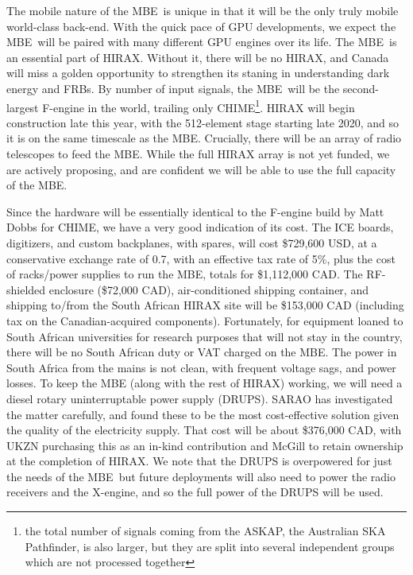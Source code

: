 \documentclass[letterpaper,11pt,preprint]{aastex}
\makeatletter
\newcommand{\mbe}{{\rm MBE}}
\def\section{\@startsection {section}{1}{\z@}{1.0ex plus 
1ex minus .2ex}{.2ex plus .2ex}{\large\bf}}
\makeatother
\begin{document}
\section{Infrastructure}
The mobile nature of the \mbe\ is unique in that it will be the only
truly mobile world-class back-end.  With the quick pace of GPU
developments, we expect the \mbe\ will be paired with many different
GPU engines over its life.  The \mbe\ is an essential part of HIRAX.
Without it, there will be no HIRAX, and Canada will miss a golden
opportunity to strengthen its staning in understanding dark energy and
FRBs.  By number of input signals, the \mbe\ will be the
second-largest F-engine in the world, trailing only CHIME\footnote{the
  total number of signals coming from the ASKAP, the Australian SKA
  Pathfinder, is also larger, but they are split into several
  independent groups which are not processed together}.  HIRAX will
begin construction late this year, with the 512-element stage starting
late 2020, and so it is on the same timescale as the \mbe.  Crucially,
there will be an array of radio telescopes to feed the \mbe.  While
the full HIRAX array is not yet funded, we are actively proposing, and
are confident we will be able to use the full capacity of the \mbe. 

Since the hardware will be essentially identical to the F-engine build
by Matt Dobbs for CHIME, we have a very good indication of its cost.
The ICE boards, digitizers, and custom backplanes, with spares, will
cost \$729,600 USD, at a conservative exchange rate of 0.7, with an
effective tax rate of 5\%, plus the cost of racks/power supplies to
run the \mbe, totals for \$1,112,000 CAD.  The RF-shielded enclosure
(\$72,000 CAD), air-conditioned shipping container, and shipping
to/from the South African HIRAX site will be \$153,000 CAD (including
tax on the Canadian-acquired components).  Fortunately, for equipment
loaned to South African universities for research purposes that will
not stay in the country, there will be no South African duty or VAT
charged on the \mbe.  The power in South Africa from the mains is not
clean, with frequent voltage sags, and power losses.  To keep the \mbe
(along with the rest of HIRAX) working, we will need a diesel rotary
uninterruptable power supply (DRUPS).  SARAO has investigated the
matter carefully, and found these to be the most cost-effective
solution given the quality of the electricity supply.  That cost
will be about \$376,000 CAD, with UKZN purchasing this as an in-kind
contribution and McGill to retain ownership at the completion of
HIRAX.  We note that the DRUPS is overpowered for just the needs of the
\mbe\, but future deployments will also need to power the radio
receivers and the X-engine, and so the full power of the DRUPS will be used.
\end{document}
